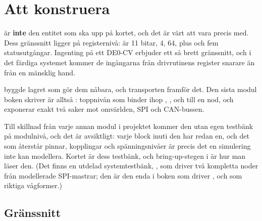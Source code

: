 
\section{Att konstruera }
\label{c19:sec:node}

 är \textbf{inte} den entitet som ska upp på kortet, och det är värt att vara
precis med. Dess gränssnitt ligger på registernivå:  är 11 bitar,  4,
 64, plus  och fem statusutgångar. Ingenting på ett DE0-CV erbjuder ett så
brett gränssnitt, och i det färdiga systemet kommer de ingångarna från drivrutinens register snarare
än från en mänsklig hand.

 byggde lagret som gör dem nåbara, och  transporten framför
det. Den sista modul boken skriver är alltså : toppnivån som binder ihop
, ,  och  till en nod,
och exponerar exakt två saker mot omvärlden, SPI och CAN-bussen.

Till skillnad från varje annan modul i projektet kommer den utan egen testbänk på modulnivå, och det
är avsiktligt: varje block inuti den har redan en, och det som återstår \textemdash{} pinnar,
kopplingar och spänningsnivåer \textemdash{} är precis det en simulering inte kan modellera. Kortet
är dess testbänk, och bring-up-stegen i  är hur man läser den. (Det finns en
utdelad systemtestbänk, , som driver två kompletta noder från modellerade
SPI-mastrar; den är den enda i boken som driver ,  och  som riktiga
vågformer.)

\subsection*{Gränssnitt}

